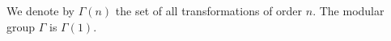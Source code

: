 We denote by $\Gamma(n)$ the set of all transformations of order $n$. The modular group $\Gamma$ is $\Gamma(1)$.
